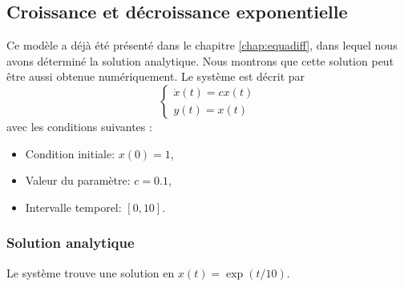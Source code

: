         \subsection{Croissance et décroissance exponentielle}
            Ce modèle a déjà été présenté dans le chapitre \ref{chap:equadiff}, dans lequel nous avons déterminé la solution analytique. Nous montrons que cette solution peut être aussi obtenue numériquement. Le système est décrit par
            \begin{equation*}
            \begin{cases}
            \dot x(t)=c x(t)\\
            y(t)=x(t)
            \end{cases}
            \end{equation*}
            avec les conditions suivantes :
            \begin{itemize}
                \item Condition initiale: $x(0)=1$,
                \item Valeur du paramètre: $c=0.1$,
                \item Intervalle temporel: $[0,10]$.
            \end{itemize}

            \subsubsection{Solution analytique}
                Le système trouve une solution en $x(t) = \exp(t/10)$. 
        
